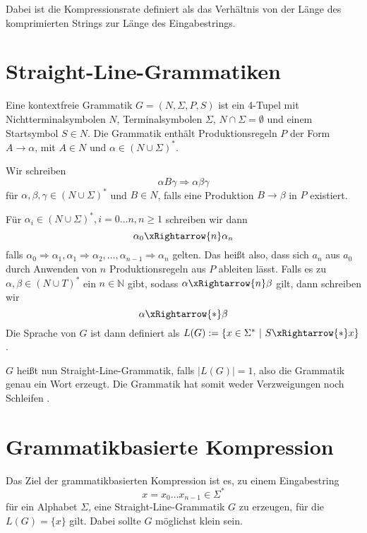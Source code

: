 Dabei ist die Kompressionsrate definiert als das Verhältnis von der Länge des komprimierten Strings zur Länge des Eingabestrings.

\section{Straight-Line-Grammatiken}

Eine kontextfreie Grammatik $G = (N, \Sigma, P, S)$ ist ein 4-Tupel mit Nichtterminalsymbolen $N$, Terminalsymbolen $\Sigma$, $N \cap \Sigma = \emptyset$ und einem Startsymbol $S \in N$.
Die Grammatik enthält Produktionsregeln $P$ der Form $A \rightarrow \alpha$, mit $A \in N$ und $\alpha \in (N \cup \Sigma)^*$.

Wir schreiben 
\begin{equation*}
    \alpha B \gamma \Rightarrow \alpha \beta \gamma
\end{equation*}
für $\alpha, \beta, \gamma \in (N \cup \Sigma)^*$ und $B \in N$, falls eine Produktion $B \rightarrow \beta$ in $P$ existiert. 

Für $\alpha_i \in (N \cup \Sigma)^*, i = 0 \dots n, n \geq 1$ schreiben wir dann 
\begin{equation*}
    \alpha_0 \xRightarrow{n} \alpha_n
\end{equation*}
falls $\alpha_0 \Rightarrow \alpha_1, \alpha_1 \Rightarrow \alpha_2, \dots, \alpha_{n-1} \Rightarrow \alpha_n$ gelten. Das heißt also, dass sich $a_n$ aus $a_0$ durch Anwenden von $n$ Produktionsregeln aus $P$ ableiten lässt.
Falls es zu $\alpha, \beta \in (N \cup T)^*$ ein $n \in \mathbb{N}$ gibt, sodass $\alpha \xRightarrow{n} \beta$ gilt, dann schreiben wir 
\begin{equation*}
    \alpha \xRightarrow{*} \beta
\end{equation*}
Die Sprache von $G$ ist dann definiert als $L(G) := \{x \in \Sigma^*\ |\ S \xRightarrow{*} x\}$.

$G$ heißt nun Straight-Line-Grammatik, falls $|L(G)| = 1$, also die Grammatik genau ein Wort erzeugt. Die Grammatik hat somit weder Verzweigungen noch Schleifen \cite{benz_effective_2013}. 

\section{Grammatikbasierte Kompression}

Das Ziel der grammatikbasierten Kompression ist es, zu einem Eingabestring 
\begin{equation*}
    x = x_0 \dots x_{n-1} \in \Sigma^*
\end{equation*}
für ein Alphabet $\Sigma$, eine Straight-Line-Grammatik $G$ zu erzeugen, für die $L(G) = \{x\}$ gilt. Dabei sollte $G$ möglichst klein sein. 

